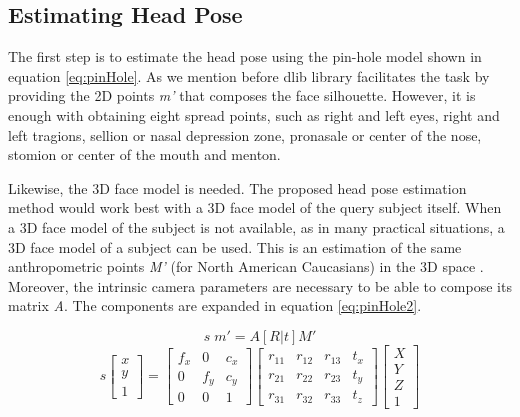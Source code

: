 \documentclass{sig-alternate}
\begin{document}
\subsection{Estimating Head Pose}
The first step is to estimate the head pose using the pin-hole model shown in equation \ref{eq:pinHole}. As we mention before dlib library facilitates the task by providing the 2D points \textit{m'} that composes the face silhouette. However, it is enough with obtaining eight spread points, such as right and left eyes, right and left tragions, sellion or nasal depression zone, pronasale or center of the nose, stomion or center of the mouth and menton.

Likewise, the 3D face model is needed. The proposed head pose estimation method would work best with a 3D face model of the query subject itself. When a 3D face model of the subject is not available, as in many practical situations, a 3D face model of a subject can be used. This is an estimation of the same anthropometric points \textit{M'} (for North American Caucasians) in the 3D space \cite{farkas1994anthropometry}. Moreover, the intrinsic camera parameters are necessary to be able to compose its matrix \textit{A}. The components are expanded in equation \ref{eq:pinHole2}.	

\begin{equation}
s  \; m' = A [R|t] M'
\label{eq:pinHole}
\end{equation}
\begin{equation}
s
\begin{bmatrix}
x \\
y \\
1
\end{bmatrix}
=
\begin{bmatrix}
f_x & 0 & c_x  \\
0 & f_y & c_y  \\
0 & 0 & 1 
\end{bmatrix}
\begin{bmatrix}
r_{11} & r_{12} & r_{13} & t_x  \\
r_{21} & r_{22} & r_{23} & t_y  \\
r_{31} & r_{32} & r_{33} & t_z  
\end{bmatrix}
\begin{bmatrix}
X \\
Y \\
Z \\
1
\end{bmatrix}
\label{eq:pinHole2}
\end{equation}
\end{document}
